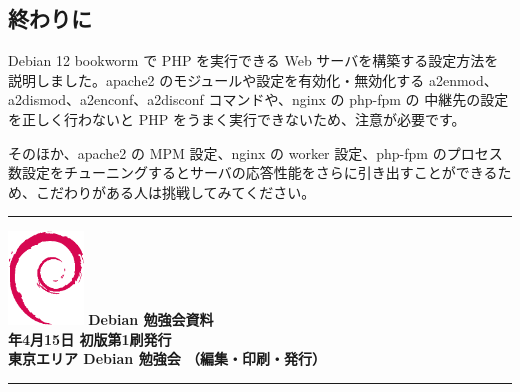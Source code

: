 \documentclass[mingoth,a4paper]{jsarticle}
\newcommand{\debmtgyear}{2023}
\newcommand{\debmtgmonth}{4}
\newcommand{\debmtgdate}{15}
\begin{document}
\subsection{終わりに}

Debian 12 bookworm で PHP を実行できる Web サーバを構築する設定方法を説明しました。apache2 のモジュールや設定を有効化・無効化する a2enmod、a2dismod、a2enconf、a2disconf コマンドや、nginx の php-fpm の 中継先の設定を正しく行わないと PHP をうまく実行できないため、注意が必要です。

そのほか、apache2 の MPM 設定、nginx の worker 設定、php-fpm のプロセス数設定をチューニングするとサーバの応答性能をさらに引き出すことができるため、こだわりがある人は挑戦してみてください。



\mbox{}\newpage
\mbox{}\newpage
\mbox{}\newpage

\vspace*{15cm}
\hrule
\vspace{2mm}
\includegraphics[width=2cm]{image-assets/openlogo-nd.eps}
\noindent \Large \bf Debian 勉強会資料\\
\noindent \normalfont \debmtgyear{}年\debmtgmonth{}月\debmtgdate{}日 \hspace{5mm}  初版第1刷発行\\
\noindent \normalfont 東京エリア Debian 勉強会 （編集・印刷・発行）\\
\hrule
\end{document}
